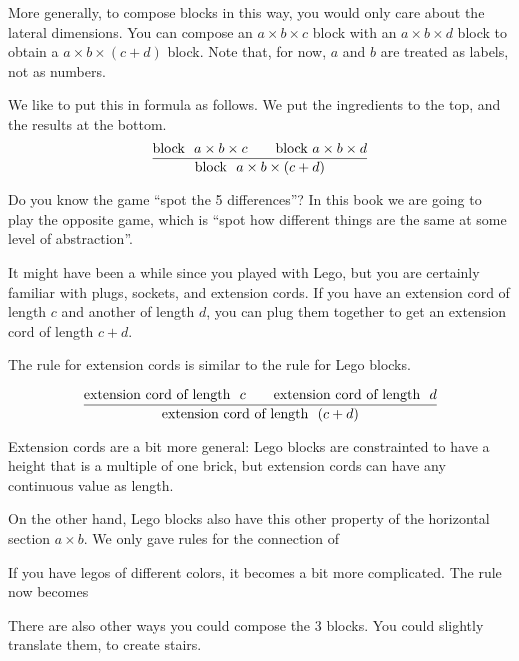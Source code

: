 More generally, to compose blocks in this way, you would only care about the lateral dimensions.
You can compose an $a \times b \times c$ block with an  $a \times b \times d$ block to obtain a  $a \times b \times( c + d)$ block.
Note that, for now, $a$ and $b$ are treated as labels, not as numbers.

We like to put this in formula as follows. We put the ingredients to the top, and the results at the bottom.
%
\begin{equation}
  \frac{\text{block }\ a \times b \times c \qquad\text{block}\ a \times b \times d }{%
    \text{block }\ a \times b \times (c+d)%
  }
\end{equation}


Do you know the game ``spot the 5 differences''? In this book we are going to play the opposite game, which
is ``spot how different things are the same at some level of abstraction''.

It might have been a while
since you played with Lego, but you are certainly familiar with plugs, sockets, and extension cords.
If you have an extension cord of length $c$ and another of length $d$, you can plug them together to get an extension cord of length $c+d$.



The rule for extension cords is similar to the rule for Lego blocks.

\begin{equation}
  \frac{\text{extension cord of length }\ c \qquad \text{extension cord of length }\ d }{%
    \text{extension cord of length }\ (c+d)%
  }
\end{equation}

Extension cords are a bit more general: Lego blocks are constrainted to have a height that is a multiple of one brick,  but extension cords can have any continuous value as length.

On the other hand, Lego blocks also have this other property of the horizontal section $a \times b$. We only gave rules for the connection of






If you have legos of different colors, it becomes a bit more complicated. The rule now becomes


There are also other ways you could compose the 3 blocks. You could slightly translate them, to create stairs.


